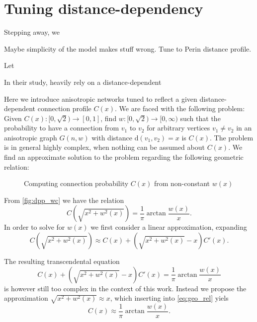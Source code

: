 \newpage
\section{Tuning distance-dependency}

Stepping away, we 




Maybe simplicity of the model makes stuff wrong. Tune to Perin
distance profile.

Let 

In their study, \textcite{Perin2011} heavily rely on a
distance-dependent 


Here we introduce anisotropic networks tuned to reflect a given
distance-dependent connection profile $C(x)$. We are faced with the
following problem: Given $C(x):[0,\sqrt{2}) \to [0,1]$, find
$w:[0,\sqrt{2}) \to [0,\infty)$ such that the probability to have a
connection from $v_1$ to $v_2$ for arbitrary vertices $v_1 \neq v_2$ in an
anisotropic graph $G(n,w)$ with distance $\mathrm{d}(v_1,v_2) = x$ is
$C(x)$. The problem is in general highly complex, when nothing can be
assumed about $C(x)$. We find an approximate solution to the problem
regarding the following geometric relation:

\begin{figure}[htp]
  \centering
  \caption{Computing connection probability $C(x)$ from non-constant $w(x)$}
  \label{fig:dpp_wc}
\end{figure}

From \autoref{fig:dpp_wc} we have the relation  
\begin{equation}
C\left(\sqrt{x^2+w^2(x)}\right) = \frac{1}{\pi} \operatorname{arctan}
\frac{w(x)}{x}. \label{eq:geo_rel}
\end{equation} 
In order to solve for $w(x)$ we first consider a linear approximation,
expanding
\[C\left(\sqrt{x^2+w^2(x)}\right) \approx C(x) + \left(\sqrt{x^2+w^2(x)} -
x\right) C'(x).\]

The resulting transcendental equation
\[C(x) + \left(\sqrt{x^2+w^2(x)} -
x\right) C'(x) = \frac{1}{\pi} \operatorname{arctan}
\frac{w(x)}{x}\]
is however still too complex in the context of this work. Instead we
propose the approximation $\sqrt{x^2 + w^2(x)} \approx  x$, which
inserting into \ref{eq:geo_rel} yiels
\begin{equation}
C(x) \approx \frac{1}{\pi} \operatorname{arctan} \label{eq:tanapprox}
\frac{w(x)}{x}.
\end{equation}

